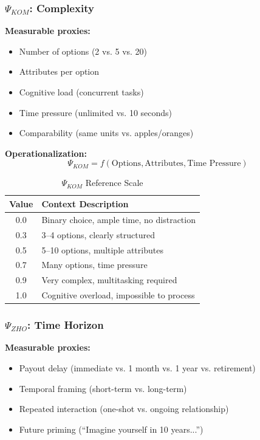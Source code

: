 \subsubsection{$\Psi_{KOM}$: Complexity}

\textbf{Measurable proxies:}
\begin{itemize}
\item Number of options (2 vs. 5 vs. 20)
\item Attributes per option
\item Cognitive load (concurrent tasks)
\item Time pressure (unlimited vs. 10 seconds)
\item Comparability (same units vs. apples/oranges)
\end{itemize}

\textbf{Operationalization:}
\begin{equation}
\Psi_{KOM} = f(\text{Options}, \text{Attributes}, \text{Time Pressure})
\end{equation}

\begin{table}[htbp]
\centering
\caption{$\Psi_{KOM}$ Reference Scale}
\begin{tabular}{@{}cl@{}}
\toprule
\textbf{Value} & \textbf{Context Description} \\
\midrule
0.0 & Binary choice, ample time, no distraction \\
0.3 & 3--4 options, clearly structured \\
0.5 & 5--10 options, multiple attributes \\
0.7 & Many options, time pressure \\
0.9 & Very complex, multitasking required \\
1.0 & Cognitive overload, impossible to process \\
\bottomrule
\end{tabular}
\end{table}

\subsubsection{$\Psi_{ZHO}$: Time Horizon}

\textbf{Measurable proxies:}
\begin{itemize}
\item Payout delay (immediate vs. 1 month vs. 1 year vs. retirement)
\item Temporal framing (short-term vs. long-term)
\item Repeated interaction (one-shot vs. ongoing relationship)
\item Future priming (``Imagine yourself in 10 years...'')
\end{itemize}

